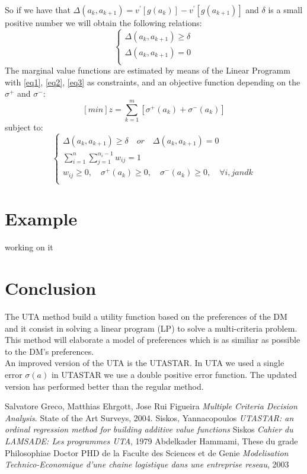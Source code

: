 \documentclass{report}
\begin{document}
So if we have that $\Delta (a_k, a_{k+1} ) = v^{'} [g(a_k)] - v^{'} [g(a_{k+1})]$ and $\delta$ is a small positive number we will obtain the following relations: 
\begin{equation}\label{eq3}
      \begin{cases}
      	\Delta (a_k, a_{k+1} ) \geq \delta\\
       	\Delta (a_k, a_{k+1} ) = 0 \\
      \end{cases}
\end{equation}
The marginal value functions are estimated by means of the Linear Programm with \eqref{eq1}, \eqref{eq2}, \eqref{eq3} as constraints, and an objective function depending on the $ \sigma^{+}$ and $\sigma^{-} $: 
$$ [min]z = \sum_{k=1}^{m} [ \sigma ^{+} (a_k) + \sigma ^{-} (a_k)]  $$
subject to: 
\begin{equation}\label{eq5}
      \begin{cases}
      	\Delta (a_k, a_{k+1} ) \geq \delta \quad or \quad \Delta (a_k, a_{k+1} ) = 0 \\
      	\sum_{i=1}^{n} \sum_{j=1}^{\alpha_i -1} w_{ij} = 1\\
       	w_{ij} \geq 0, \quad \sigma^{+}(a_k) \geq 0, \quad \sigma^{-}(a_k) \geq 0, \quad  \forall i, j  and  k\\
      \end{cases}
\end{equation}

\chapter{Example}
working on it

\chapter{Conclusion}
The UTA method build a utility function based on the preferences of the DM and it consist in solving a linear program (LP) to solve a multi-criteria problem.\\

This method will elaborate a model of preferences which is as similiar as possible to the DM's preferences.\\

An improved version of the UTA is the UTASTAR. In UTA we used a single error $\sigma(a)$ in UTASTAR we use a double positive error function. The updated version has performed better than the regular method.

\begin{thebibliography}{9}
 Salvatore Greco, Matthias Ehrgott, Jose Rui Figueira \textit{Multiple Criteria Decision Analysis}. State of the Art Surveys, 2004.
 Siskos, Yannacopoulos \textit{UTASTAR: an ordinal regression method for building additive value functions}
 Siskos \textit{Cahier du LAMSADE: Les programmes UTA}, 1979
 Abdelkader Hammami, These du grade Philosophiae Doctor PHD de la Faculte des Sciences et de Genie \textit{Modelisation Technico-Economique d'une chaine logistique dans une entreprise reseau}, 2003
\end{thebibliography}
\end{document}
